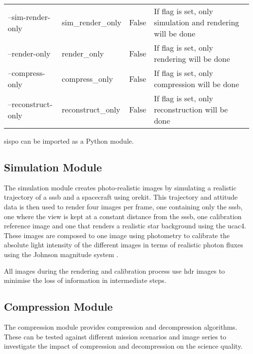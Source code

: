 \begin{table}[htpb]
\begin{tabular}{llll}
\multicolumn{1}{l|}{--sim-render-only}   & sim\_render\_only      & False                      & If flag is set, only simulation and rendering will be done                                                                \\
\multicolumn{1}{l|}{--render-only}       & render\_only           & False                      & If flag is set, only rendering will be done                                                                               \\
\multicolumn{1}{l|}{--compress-only}     & compress\_only         & False                      & If flag is set, only compression will be done                                                                             \\
\multicolumn{1}{l|}{--reconstruct-only}  & reconstruct\_only      & False                      & If flag is set, only reconstruction will be done                                                                         

\end{tabular}
\label{tab:cli_args}
\end{table}

\gls{sispo} can be imported as a Python module. 

\subsection{Simulation Module}
The simulation module creates photo-realistic images by simulating a realistic trajectory of a \gls{sssb} and a spacecraft using orekit. This trajectory and attitude data is then used to render four images per frame, one containing only the \gls{sssb}, one where the view is kept at a constant distance from the \gls{sssb}, one calibration reference image and one that renders a realistic star background using the \gls{ucac4}. These images are composed to one image using photometry to calibrate the absolute light intensity of the different images in terms of realistic photon fluxes using the Johnson magnitude system \cite{bessel1979ubvri}.

All images during the rendering and calibration process use \gls{hdr} images to minimise the loss of information in intermediate steps.

\subsection{Compression Module}
The compression module provides compression and decompression algorithms. These can be tested against different mission scenarios and image series to investigate the impact of compression and decompression on the science quality.

